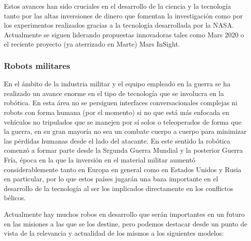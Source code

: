 Estos avances han sido cruciales en el desarrollo de la ciencia y la tecnología tanto por las altas inversiones de dinero que fomentan la investigación como por los experimentos realizados gracias a la tecnología desarrollada por la NASA. Actualmente se siguen liderando propuestas innovadoras tales como Mars 2020 o el reciente proyecto (ya aterrizado en Marte) Mars InSight.

\subsubsection{Robots militares}
En el ámbito de la industria militar y el equipo empleado en la guerra se ha realizado un avance enorme en el tipo de tecnología que se involucra en la robótica. En esta área no se persiguen interfaces conversacionales complejas ni robots con forma humana (por el momento) si no que está más enfocada en vehículos no tripulados que se manejen por sí solos o teleoperados de forma que la guerra, en su gran mayoría no sea un combate cuerpo a cuerpo para minimizar las pérdidas humanas desde el lado del atacante. En este sentido la robótica comenzó a formar parte desde la Srgunda Guerra Mundial y la posterior Guerra Fría, época en la que la inversión en el material militar aumentó considerablemente tanto en Europa en general como en Estados Unidos y Rusia en particular, por lo que estos países jugarán una baza importante en el desarrollo de la tecnología al ser los implicados directamente en los conflictos bélicos.

Actualmente hay muchos robos en desarrollo que serán importantes en un futuro en las misiones a las que se los destine, pero podemos destacar desde un punto de vista de la relevancia y actualidad de los mismos a los siguientes modelos:

